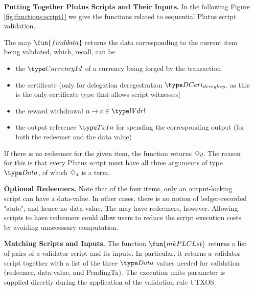 \clearpage

\textbf{Putting Together Plutus Scripts and Their Inputs.}
In the following Figure \ref{fig:functions:script1} we give the functions
related to sequential Plutus script validation.



The map $\fun{finddata}$ returns the
data corresponding to the current item being validated, which, recall, can
be

\begin{itemize}
  \item the $\CurrencyId$ of a currency being forged by the transaction
  \item the certificate (only for delegation deregestration $\DCertDeRegKey$,
  as this is the only certificate type that allows script witnesses)
  \item the reward withdrawal $a \to c \in \Wdrl$
  \item the output reference $\TxIn$ for spending the corresponding output
  (for both the redeemer and the data value)
\end{itemize}

If there is no redeemer for the given item, the function returns $\Diamond_d$.
The reason for this is that every Plutus script must have all three arguments
of type $\Data$, of which $\Diamond_d$ is a term.

\textbf{Optional Redeemers.} Note that of the four items, only an
output-locking script can have a data-value. In other cases, there is no
notion of ledger-recorded "state", and hence no data-value.
The may have redeemers, however.
Allowing scripts to have redeemers could allow users to reduce the script
execution costs by avoiding unnecessary computation.

\textbf{Matching Scripts and Inputs.}
The function $\fun{mkPLCLst}$ returns a list of pairs of a validator script and
its inputs. In particular, it returns a validator script together with
 a list of the three $\Data$ values needed for validation (redeemer,
 data-value, and PendingTx). The execution units parameter is supplied
 directly during the application of the validation rule UTXOS.

